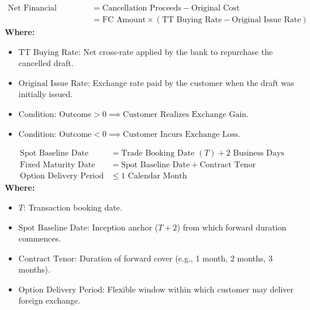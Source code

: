 \begin{formulabox}
\begin{align*}
    \text{Net Financial Outcome} &= \text{Cancellation Proceeds} - \text{Original Cost} \\
    &= \text{FC Amount} \times \left( \text{TT Buying Rate} - \text{Original Issue Rate} \right)
\end{align*}
\textbf{Where:}
\begin{itemize}[leftmargin=*, noitemsep]
    \item $\text{TT Buying Rate}$: Net cross-rate applied by the bank to repurchase the cancelled draft.
    \item $\text{Original Issue Rate}$: Exchange rate paid by the customer when the draft was initially issued.
    \item $\text{Condition: } \text{Outcome} > 0 \implies \text{Customer Realizes Exchange Gain}$.
    \item $\text{Condition: } \text{Outcome} < 0 \implies \text{Customer Incurs Exchange Loss}$.
\end{itemize}
\end{formulabox}

\begin{formulabox}
\begin{align*}
    \text{Spot Baseline Date} &= \text{Trade Booking Date } (T) + 2 \text{ Business Days} \\[0.3em]
    \text{Fixed Maturity Date} &= \text{Spot Baseline Date} + \text{Contract Tenor} \\[0.3em]
    \text{Option Delivery Period} &\le 1 \text{ Calendar Month}
\end{align*}
\textbf{Where:}
\begin{itemize}[leftmargin=*, noitemsep]
    \item $T$: Transaction booking date.
    \item $\text{Spot Baseline Date}$: Inception anchor ($T+2$) from which forward duration commences.
    \item $\text{Contract Tenor}$: Duration of forward cover (e.g., 1 month, 2 months, 3 months).
    \item $\text{Option Delivery Period}$: Flexible window within which customer may deliver foreign exchange.
\end{itemize}
\end{formulabox}

